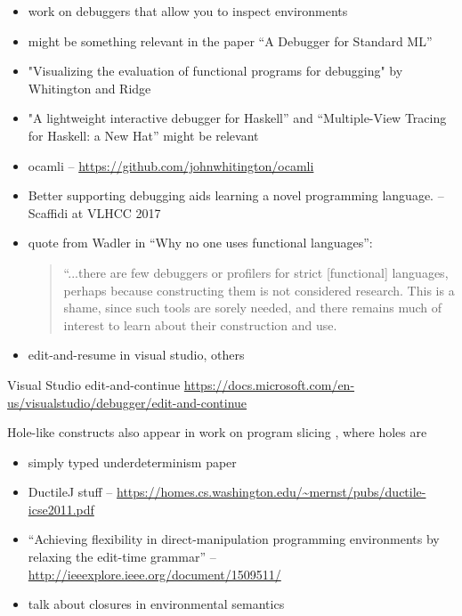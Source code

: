 \begin{itemize}
	\item work on debuggers that allow you to inspect environments
  \item might be something relevant in the paper ``A Debugger for Standard ML'' 
  \item "Visualizing the evaluation of functional programs for debugging" by Whitington and Ridge
  \item "A lightweight interactive debugger for Haskell'' and ``Multiple-View Tracing for Haskell: a New Hat'' might be relevant
  \item ocamli -- \url{https://github.com/johnwhitington/ocamli}
  \item Better supporting debugging aids learning a novel programming language. -- Scaffidi at VLHCC 2017
  \item quote from Wadler in ``Why no one uses functional languages'':
    \begin{quote}
    “...there are few debuggers or
profilers for strict [functional] languages, perhaps because constructing them is not considered
research. This is a shame, since such tools are sorely needed, and there remains much of
interest to learn about their construction and use.
    \end{quote}
   \item edit-and-resume in visual studio, others
\end{itemize}

Visual Studio edit-and-continue \url{https://docs.microsoft.com/en-us/visualstudio/debugger/edit-and-continue}

Hole-like constructs also appear in work on program slicing
\cite{DBLP:conf/icfp/PereraACL12}, where holes are 


\begin{itemize}
	\item simply typed underdeterminism paper
	\item DuctileJ stuff -- \url{https://homes.cs.washington.edu/~mernst/pubs/ductile-icse2011.pdf}
	\item ``Achieving flexibility in direct-manipulation programming environments by relaxing the edit-time grammar'' -- \url{http://ieeexplore.ieee.org/document/1509511/}
	\item talk about closures in environmental semantics
\end{itemize}



